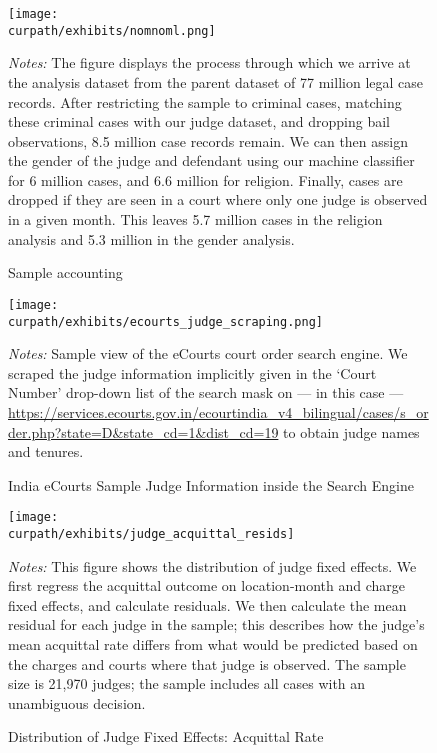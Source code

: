 \documentclass[12pt,english]{article}
\newcommand{\HOME}{\string~}
\newcommand{\curpath}{\HOME/ddl/justice-overleaf}
\newcommand{\curpath}{.}
\begin{document}
\begin{appendices}
\newpage
\begin{figure}[htp!]
 \centering
 \caption{Sample accounting}
 \texttt{[image: \\curpath/exhibits/nomnoml.png]}
 \label{fig:nomnoml}
 \begin{minipage}{1.0\textwidth}
    {\scriptsize \emph{Notes:} The figure displays the process through which we arrive at the analysis dataset from the parent dataset of 77 million legal case records. After restricting the sample to criminal cases, matching these criminal cases with our judge dataset, and dropping bail observations, 8.5 million case records remain. We can then assign the gender of the judge and defendant using our machine classifier for 6 million cases, and 6.6 million for religion. Finally, cases are dropped if they are seen in a court where only one judge is observed in a given month. This leaves 5.7 million cases in the religion analysis and 5.3 million in the gender analysis.\par}
 \end{minipage}
\end{figure}

\begin{figure}[htp!]
 \centering
 \caption{India eCourts Sample Judge Information inside the Search Engine}
 \texttt{[image: \\curpath/exhibits/ecourts\_judge\_scraping.png]}
 \label{fig:ecourts_judge_scraping}
 \begin{minipage}{1.0\textwidth}
    {\scriptsize \emph{Notes:} Sample view of the eCourts court order search engine. We scraped the judge information implicitly given in the `Court Number' drop-down list of the search mask on --- in this case --- \url{https://services.ecourts.gov.in/ecourtindia_v4_bilingual/cases/s_order.php?state=D&state_cd=1&dist_cd=19} to obtain judge names and tenures.\par}
 \end{minipage}
\end{figure}

\begin{figure}
    \centering
    \caption{Distribution of Judge Fixed Effects: Acquittal Rate}
    \texttt{[image: \\curpath/exhibits/judge\_acquittal\_resids]} 
    \label{fig:judge_resids}
     \begin{minipage}{1.0\textwidth}
       {\scriptsize \emph{Notes:} This figure shows the distribution of judge fixed effects. We first regress the acquittal outcome on location-month and charge fixed effects, and calculate residuals. We then calculate the mean residual for each judge in the sample; this describes how the judge's mean acquittal rate differs from what would be predicted based on the charges and courts where that judge is observed. The sample size is 21,970 judges; the sample includes all cases with an unambiguous decision.\par}
 \end{minipage}
\end{figure}


\end{appendices}
\end{document}
